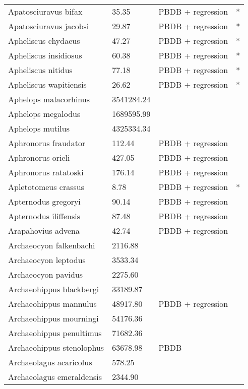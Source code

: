 \documentclass{article}
\begin{document}
\begin{center}
\begin{longtable}{p{} p{} p{} p{}}
    Apatosciuravus bifax & 35.35 & PBDB + regression & * \\ 
    Apatosciuravus jacobsi & 29.87 & PBDB + regression & * \\ 
    Apheliscus chydaeus & 47.27 & PBDB + regression & * \\ 
    Apheliscus insidiosus & 60.38 & PBDB + regression & * \\ 
    Apheliscus nitidus & 77.18 & PBDB + regression & * \\ 
    Apheliscus wapitiensis & 26.62 & PBDB + regression & * \\ 
    Aphelops malacorhinus & 3541284.24 & \cite{Tomiya2013} &  \\ 
    Aphelops megalodus & 1689595.99 & \cite{Tomiya2013} &  \\ 
    Aphelops mutilus & 4325334.34 & \cite{Tomiya2013} &  \\ 
    Aphronorus fraudator & 112.44 & PBDB + regression &  \\ 
    Aphronorus orieli & 427.05 & PBDB + regression &  \\ 
    Aphronorus ratatoski & 176.14 & PBDB + regression &  \\ 
    Apletotomeus crassus & 8.78 & PBDB + regression & * \\ 
    Apternodus gregoryi & 90.14 & PBDB + regression &  \\ 
    Apternodus iliffensis & 87.48 & PBDB + regression &  \\ 
    Arapahovius advena & 42.74 & PBDB + regression &  \\ 
    Archaeocyon falkenbachi & 2116.88 & \cite{Stirton1932} &  \\ 
    Archaeocyon leptodus & 3533.34 & \cite{Tomiya2013} &  \\ 
    Archaeocyon pavidus & 2275.60 & \cite{Tomiya2013} &  \\ 
    Archaeohippus blackbergi & 33189.87 & \cite{Tomiya2013} &  \\ 
    Archaeohippus mannulus & 48917.80 & PBDB + regression &  \\ 
    Archaeohippus mourningi & 54176.36 & \cite{Tomiya2013} &  \\ 
    Archaeohippus penultimus & 71682.36 & \cite{Tomiya2013} &  \\ 
    Archaeohippus stenolophus & 63678.98 & PBDB &  \\ 
    Archaeolagus acaricolus & 578.25 & \cite{Tomiya2013} &  \\ 
    Archaeolagus emeraldensis & 2344.90 & \cite{Tomiya2013} &  \\ 

\end{longtable}
\end{center}
\end{document}
